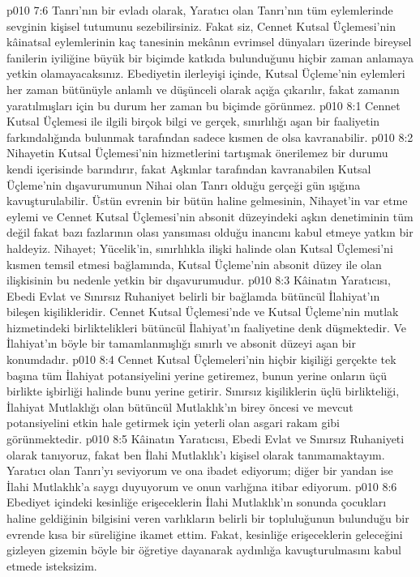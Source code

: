 \vs p010 7:6 Tanrı’nın bir evladı olarak, Yaratıcı olan Tanrı’nın tüm eylemlerinde sevginin kişisel tutumunu sezebilirsiniz. Fakat siz, Cennet Kutsal Üçlemesi’nin kâinatsal eylemlerinin kaç tanesinin mekânın evrimsel dünyaları üzerinde bireysel fanilerin iyiliğine büyük bir biçimde katkıda bulunduğunu hiçbir zaman anlamaya yetkin olamayacaksınız. Ebediyetin ilerleyişi içinde, Kutsal Üçleme'nin eylemleri her zaman bütünüyle anlamlı ve düşünceli olarak açığa çıkarılır, fakat zamanın yaratılmışları için bu durum her zaman bu biçimde görünmez.
\vs p010 8:1 Cennet Kutsal Üçlemesi ile ilgili birçok bilgi ve gerçek, sınırlılığı aşan bir faaliyetin farkındalığında bulunmak tarafından sadece kısmen de olsa kavranabilir.
\vs p010 8:2 Nihayetin Kutsal Üçlemesi’nin hizmetlerini tartışmak önerilemez bir durumu kendi içerisinde barındırır, fakat Aşkınlar tarafından kavranabilen Kutsal Üçleme’nin dışavurumunun Nihai olan Tanrı olduğu gerçeği gün ışığına kavuşturulabilir. Üstün evrenin bir bütün haline gelmesinin, Nihayet’in var etme eylemi ve Cennet Kutsal Üçlemesi’nin absonit düzeyindeki aşkın denetiminin tüm değil fakat bazı fazlarının olası yansıması olduğu inancını kabul etmeye yatkın bir haldeyiz. Nihayet; Yücelik’in, sınırlılıkla ilişki halinde olan Kutsal Üçlemesi’ni kısmen temsil etmesi bağlamında, Kutsal Üçleme’nin absonit düzey ile olan ilişkisinin bu nedenle yetkin bir dışavurumudur.
\vs p010 8:3 Kâinatın Yaratıcısı, Ebedi Evlat ve Sınırsız Ruhaniyet belirli bir bağlamda bütüncül İlahiyat’ın bileşen kişilikleridir. Cennet Kutsal Üçlemesi’nde ve Kutsal Üçleme’nin mutlak hizmetindeki birliktelikleri bütüncül İlahiyat’ın faaliyetine denk düşmektedir. Ve İlahiyat’ın böyle bir tamamlanmışlığı sınırlı ve absonit düzeyi aşan bir konumdadır.
\vs p010 8:4 Cennet Kutsal Üçlemeleri’nin hiçbir kişiliği gerçekte tek başına tüm İlahiyat potansiyelini yerine getiremez, bunun yerine onların üçü birlikte işbirliği halinde bunu yerine getirir. Sınırsız kişiliklerin üçlü birlikteliği, İlahiyat Mutlaklığı olan bütüncül Mutlaklık’ın birey öncesi ve mevcut potansiyelini etkin hale getirmek için yeterli olan asgari rakam gibi görünmektedir.
\vs p010 8:5 Kâinatın Yaratıcısı, Ebedi Evlat ve Sınırsız Ruhaniyeti  olarak tanıyoruz, fakat ben İlahi Mutlaklık’ı kişisel olarak tanımamaktayım. Yaratıcı olan Tanrı’yı seviyorum ve ona ibadet ediyorum; diğer bir yandan ise İlahi Mutlaklık’a saygı duyuyorum ve onun varlığına itibar ediyorum.
\vs p010 8:6 Ebediyet içindeki kesinliğe erişeceklerin İlahi Mutlaklık’ın sonunda çocukları haline geldiğinin bilgisini veren varlıkların belirli bir topluluğunun bulunduğu bir evrende kısa bir süreliğine ikamet ettim. Fakat, kesinliğe erişeceklerin geleceğini gizleyen gizemin böyle bir öğretiye dayanarak aydınlığa kavuşturulmasını kabul etmede isteksizim.
